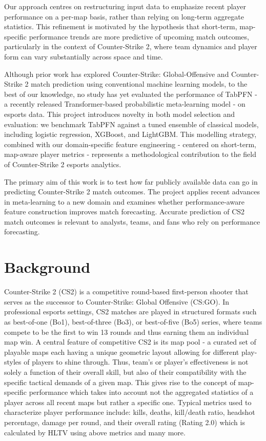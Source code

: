 \documentclass[11pt]{article}
\begin{document}
Our approach centres on restructuring input data to emphasize recent player performance on a per-map basis, rather than relying on long-term aggregate statistics. This refinement is motivated by the hypothesis that short-term, map-specific performance trends are more predictive of upcoming match outcomes, particularly in the context of Counter-Strike 2, where team dynamics and player form can vary substantially across space and time.

Although prior work has explored Counter-Strike: Global-Offensive and Counter-Strike 2 match prediction using conventional machine learning models, to the best of our knowledge, no study has yet evaluated the performance of TabPFN - a recently released Transformer-based probabilistic meta-learning model - on esports data. This project introduces novelty in both model selection and evaluation: we benchmark TabPFN against a tuned ensemble of classical models, including logistic regression, XGBoost, and LightGBM. This modelling strategy, combined with our domain-specific feature engineering - centered on short-term, map-aware player metrics - represents a methodological contribution to the field of Counter-Strike 2 esports analytics.

The primary aim of this work is to test how far publicly available data can go in predicting Counter-Strike 2 match outcomes. The project applies recent advances in meta-learning to a new domain and examines whether performance-aware feature construction improves match forecasting. Accurate prediction of CS2 match outcomes is relevant to analysts, teams, and fans who rely on performance forecasting.

\section{Background}
Counter-Strike 2 (CS2) is a competitive round-based first-person shooter that serves as the successor to Counter-Strike: Global Offensive (CS:GO). In professional esports settings, CS2 matches are played in structured formats such as best-of-one (Bo1), best-of-three (Bo3), or best-of-five (Bo5) series, where teams compete to be the first to win 13 rounds and thus earning them an individual map win. A central feature of competitive CS2 is its map pool - a curated set of playable maps each having a unique geometric layout allowing for different play-styles of players to shine through. Thus, team’s or player’s effectiveness is not solely a function of their overall skill, but also of their compatibility with the specific tactical demands of a given map. This gives rise to the concept of map-specific performance which takes into account not the aggregated statistics of a player across all recent maps but rather a specific one. Typical metrics used to characterize player performance include: kills, deaths, kill/death ratio, headshot percentage, damage per round, and their overall rating (Rating 2.0) which is calculated by HLTV using above metrics and many more.
\end{document}
